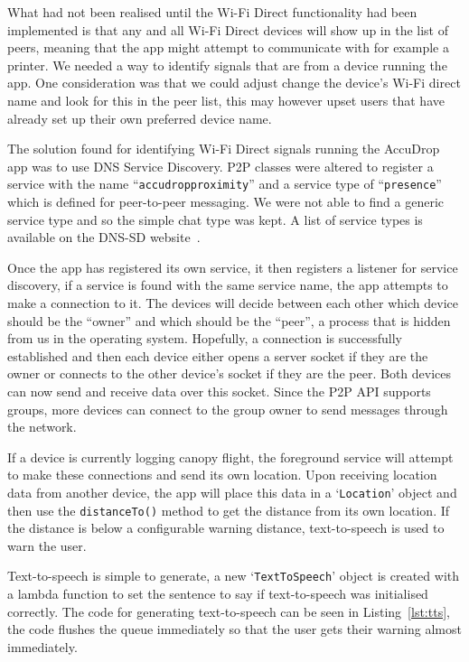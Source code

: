 What had not been realised until the Wi-Fi Direct functionality had been implemented is that any and all Wi-Fi Direct devices will show up in the list of peers, meaning that the app might attempt to communicate with for example a printer. We needed a way to identify signals that are from a device running the app. One consideration was that we could adjust change the device's Wi-Fi direct name and look for this in the peer list, this may however upset users that have already set up their own preferred device name.

The solution found for identifying Wi-Fi Direct signals running the AccuDrop app was to use DNS Service Discovery. P2P classes were altered to register a service with the name ``\texttt{accudropproximity}'' and a service type of ``\texttt{presence}'' which is defined for peer-to-peer messaging. We were not able to find a generic service type and so the simple chat type was kept. A list of service types is available on the DNS-SD website~\cite{_dns_????}.

Once the app has registered its own service, it then registers a listener for service discovery, if a service is found with the same service name, the app attempts to make a connection to it. The devices will decide between each other which device should be the ``owner'' and which should be the ``peer'', a process that is hidden from us in the operating system. Hopefully, a connection is successfully established and then each device either opens a server socket if they are the owner or connects to the other device's socket if they are the peer. Both devices can now send and receive data over this socket. Since the P2P API supports groups, more devices can connect to the group owner to send messages through the network.

If a device is currently logging canopy flight, the foreground service will attempt to make these connections and send its own location. Upon receiving location data from another device, the app will place this data in a `\texttt{Location}' object and then use the \texttt{distanceTo()} method to get the distance from its own location. If the distance is below a configurable warning distance, text-to-speech is used to warn the user.

Text-to-speech is simple to generate, a new `\texttt{TextToSpeech}' object is created with a lambda function to set the sentence to say if text-to-speech was initialised correctly. The code for generating text-to-speech can be seen in Listing~\vref{lst:tts}, the code flushes the queue immediately so that the user gets their warning almost immediately.

